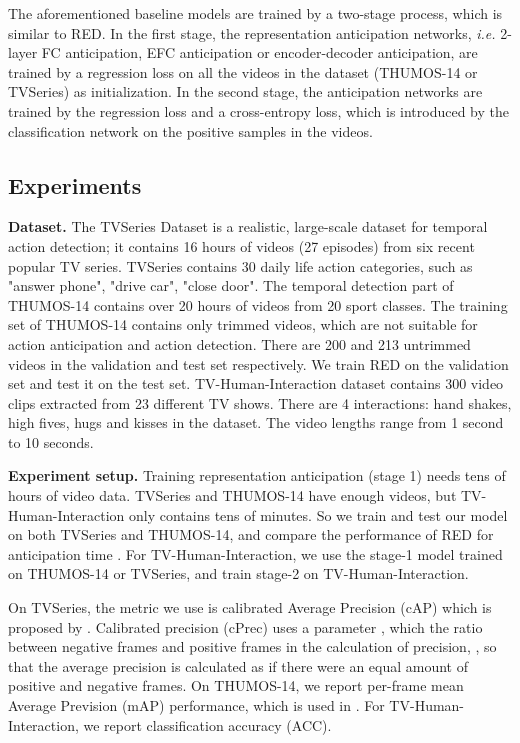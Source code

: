 \documentclass{bmvc2k}
\begin{document}
The aforementioned baseline models are trained by a two-stage process, which is similar to RED. In the first stage, the representation anticipation networks, \emph{i.e.} 2-layer FC anticipation, EFC anticipation or encoder-decoder anticipation, are trained by a regression loss on all the videos in the dataset (THUMOS-14 or TVSeries) as initialization. In the second stage, the anticipation networks are trained by the regression loss and a cross-entropy loss, which is introduced by the classification network on the positive samples in the videos. 

\subsection {Experiments}


\textbf{Dataset.} The TVSeries Dataset \cite{de2016online} is a realistic, large-scale dataset for temporal action detection; it contains 16 hours of videos (27 episodes) from six recent popular TV series. TVSeries contains 30 daily life action categories, such as "answer phone", "drive car", "close door". The temporal detection part of THUMOS-14 contains over 20 hours of videos from 20 sport classes. The training set of THUMOS-14 contains only trimmed videos, which are not suitable for action anticipation and action detection. There are 200 and 213 untrimmed  videos in the validation and test set respectively. We train RED on the validation set and test it on the test set.
TV-Human-Interaction \cite{patron2010high} dataset contains 300 video clips extracted from 23 different TV shows. There are 4 interactions: hand shakes, high fives, hugs and kisses in the dataset. The video lengths range from 1 second to 10 seconds.

\textbf{Experiment setup.} Training representation anticipation (stage 1) needs tens of hours of video data. TVSeries and THUMOS-14 have enough videos, but TV-Human-Interaction only contains tens of minutes. So we train and test our model on both TVSeries and THUMOS-14, and compare the performance of RED for anticipation time . For TV-Human-Interaction, we use the stage-1 model trained on THUMOS-14 or TVSeries, and train stage-2 on TV-Human-Interaction.

On TVSeries, the metric we use is calibrated Average Precision (cAP) which is proposed by \cite{de2016online}. Calibrated precision (cPrec) uses a parameter , which the ratio between negative frames and positive frames in the calculation of precision, , so that the average precision is calculated as if there were an equal amount of positive and negative frames. On THUMOS-14, we report per-frame mean Average Prevision (mAP) performance, which is used in \cite{yeung2015every}. For TV-Human-Interaction, we report classification accuracy (ACC).
\end{document}
